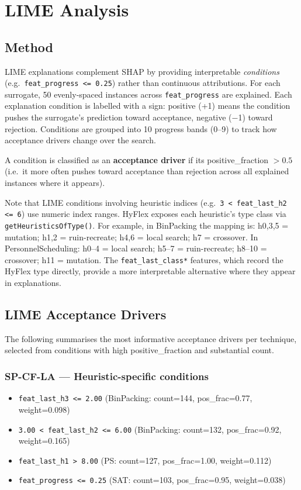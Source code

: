 \documentclass[11pt,a4paper]{article}
\begin{document}
\section{LIME Analysis}

\subsection{Method}

LIME explanations complement SHAP by providing interpretable \emph{conditions}
(e.g.\ \texttt{feat\_progress <= 0.25}) rather than continuous attributions. For each
surrogate, 50 evenly-spaced instances across \texttt{feat\_progress} are explained.
Each explanation condition is labelled with a sign: positive (+1) means the condition
pushes the surrogate's prediction toward acceptance, negative ($-$1) toward rejection.
Conditions are grouped into 10 progress bands (0--9) to track how acceptance drivers
change over the search.

A condition is classified as an \textbf{acceptance driver} if its
positive\_fraction $> 0.5$ (i.e.\ it more often pushes toward acceptance than
rejection across all explained instances where it appears).

Note that LIME conditions involving heuristic indices (e.g.\
\texttt{3 < feat\_last\_h2 <= 6}) use numeric index ranges. HyFlex exposes each
heuristic's type class via \texttt{getHeuristicsOfType()}. For example, in
BinPacking the mapping is: h0,3,5 = mutation; h1,2 = ruin-recreate;
h4,6 = local search; h7 = crossover. In PersonnelScheduling:
h0--4 = local search; h5--7 = ruin-recreate; h8--10 = crossover;
h11 = mutation. The \texttt{feat\_last\_class*} features,
which record the HyFlex type directly, provide a more interpretable alternative
where they appear in explanations.

\subsection{LIME Acceptance Drivers}

The following summarises the most informative acceptance drivers per technique,
selected from conditions with high positive\_fraction and substantial count.

\subsubsection*{SP-CF-LA --- Heuristic-specific conditions}

\begin{itemize}[nosep]
  \item \texttt{feat\_last\_h3 <= 2.00} (BinPacking: count=144, pos\_frac=0.77, weight=0.098)
  \item \texttt{3.00 < feat\_last\_h2 <= 6.00} (BinPacking: count=132, pos\_frac=0.92, weight=0.165)
  \item \texttt{feat\_last\_h1 > 8.00} (PS: count=127, pos\_frac=1.00, weight=0.112)
  \item \texttt{feat\_progress <= 0.25} (SAT: count=103, pos\_frac=0.95, weight=0.038)
\end{itemize}
\end{document}
